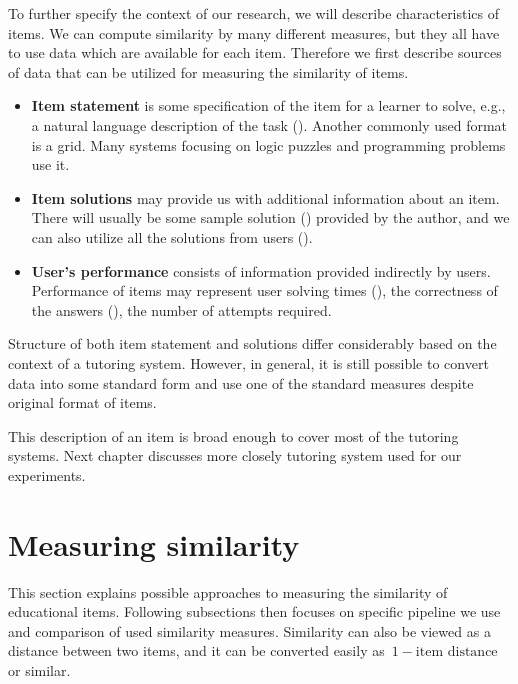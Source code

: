 \documentclass[
  printed, %
  table,   %
  nolof,     %
  nolot,     %
  color,
  final,
  nocover
]{fithesis3}
\begin{document}

To further specify the context of our research, we will describe characteristics of items. We can compute similarity by many different measures, but they all have to use data which are available for each item. Therefore we first describe sources of data that can be utilized for measuring the similarity of items.

\begin{itemize}
\item
  \textbf{Item statement} is some specification of the item for a learner to solve, e.g., a natural language description of the task (). Another commonly used format is a grid. Many systems focusing on logic puzzles and programming problems use it.
\item
  \textbf{Item solutions} may provide us with additional information about an item. There will usually be some sample solution () provided by the author, and we can also utilize all the solutions from users ().
\item
  \textbf{User's performance} consists of information provided indirectly by users. Performance of items may represent user solving times (), the correctness of the answers (), the number of attempts required.
\end{itemize}

Structure of both item statement and solutions differ considerably based on the context of a tutoring system. However, in general, it is still possible to convert data into some standard form and use one of the standard measures despite original format of items.

This description of an item is broad enough to cover most of the tutoring systems. Next chapter discusses more closely tutoring system used for our experiments.


\section{Measuring similarity}\label{measuring-similarity}

This section explains possible approaches to measuring the similarity of educational items. Following subsections then focuses on specific pipeline we use and comparison of used similarity measures. Similarity can also be viewed as a distance between two items, and it can be converted easily as~$1 - \text{item distance}$ or similar.
\end{document}
